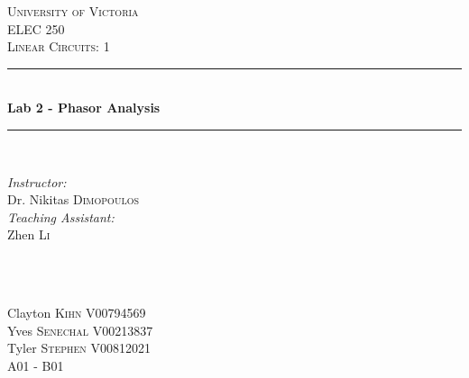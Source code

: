 \documentclass[12pt]{article}
\newcommand{\HRule}{\rule{\linewidth}{0.5mm}}
\begin{document}

\begin{titlepage}

\center
 
\textsc{\LARGE University of Victoria}\\[1cm] 	%
\textsc{\Large ELEC 250}\\[0.5cm] 			%
\textsc{\large Linear Circuits: 1}\\[0.5cm] 		%


\HRule \\[0.4cm]
{ \huge \bfseries Lab 2 - Phasor Analysis}\\[0.2cm] %
\HRule \\[1.5cm]
 
 
\begin{minipage}{0.7\textwidth}
\begin{flushleft} 

\large\emph{Instructor:} \\
Dr. Nikitas \textsc{Dimopoulos} \\
\vspace{12 pt}
\emph{Teaching Assistant:} \\
Zhen \textsc{Li}

\end{flushleft}
\end{minipage}
~
\begin{minipage}{0.1\textwidth}
\begin{flushright} \large
\vspace{12 pt}
\end{flushright}
\end{minipage}\\[2cm]


\Large Clayton \textsc{Kihn}
\large V00794569	\\
\Large Yves \textsc{Senechal}
\large V00213837	\\
\Large Tyler \textsc{Stephen}
\large V00812021	\\
A01 - B01\\[1.5cm] 



\end{titlepage}
\end{document}
